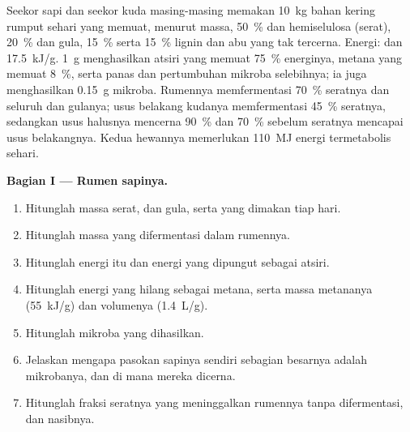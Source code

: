 \begin{problem}
\label{pb:b1:digestion-absorption:1}
Seekor sapi dan seekor kuda masing-masing memakan \qty{10}{kg} bahan
kering rumput sehari yang memuat, menurut massa, \qty{50}{\%} 
dan hemiselulosa (serat), \qty{20}{\%}  dan gula, \qty{15}{\%}
 serta \qty{15}{\%} lignin dan abu yang tak tercerna. Energi:
 dan  \qty{17.5}{kJ/g}.  \qty{1}{g}
 menghasilkan  atsiri yang memuat \qty{75}{\%}
energinya, metana yang memuat \qty{8}{\%}, serta panas dan pertumbuhan
mikroba selebihnya; ia juga menghasilkan \qty{0.15}{g}  mikroba.
Rumennya memfermentasi \qty{70}{\%} seratnya dan seluruh  dan
gulanya; usus belakang kudanya memfermentasi \qty{45}{\%} seratnya,
sedangkan usus halusnya mencerna \qty{90}{\%}  dan \qty{70}{\%}
 sebelum seratnya mencapai usus belakangnya. Kedua hewannya
memerlukan \qty{110}{MJ} energi termetabolis sehari.

\medskip
\noindent\textbf{Bagian I --- Rumen sapinya.}
\begin{enumerate}
  \item Hitunglah massa serat,  dan gula, serta  yang
        dimakan tiap hari.
  \item Hitunglah massa  yang difermentasi dalam rumennya.
  \item Hitunglah energi  itu dan energi yang dipungut
        sebagai  atsiri.
  \item Hitunglah energi yang hilang sebagai metana, serta massa
        metananya (\qty{55}{kJ/g}) dan volumenya (\qty{1.4}{L/g}).
  \item Hitunglah  mikroba yang dihasilkan.
  \item Jelaskan mengapa pasokan  sapinya sendiri sebagian
        besarnya adalah mikrobanya, dan di mana mereka dicerna.
  \item Hitunglah fraksi seratnya yang meninggalkan rumennya tanpa
        difermentasi, dan nasibnya.
\end{enumerate}


\end{problem}

